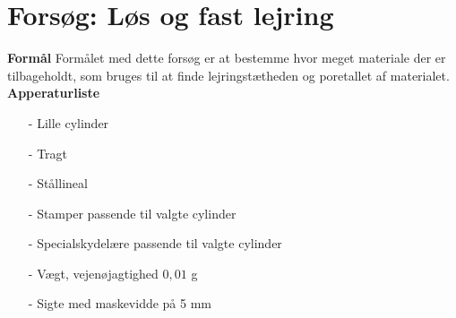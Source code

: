\chapter{Forsøg: Løs og fast lejring}

\textbf{Formål}
\newline
Formålet med dette forsøg er at bestemme hvor meget materiale der er tilbageholdt, som bruges til at finde lejringstætheden og poretallet af materialet.
\newline
\newline
\textbf{Apperaturliste}
\begin{itemize}
	\item[-] Lille cylinder
	\item[-] Tragt
	\item[-] Stållineal
	\item[-] Stamper passende til valgte cylinder
	\item[-] Specialskydelære passende til valgte cylinder
	\item[-] Vægt, vejenøjagtighed $0,\!01$ g
	\item[-] Sigte med maskevidde på 5 mm 
\end{itemize}

